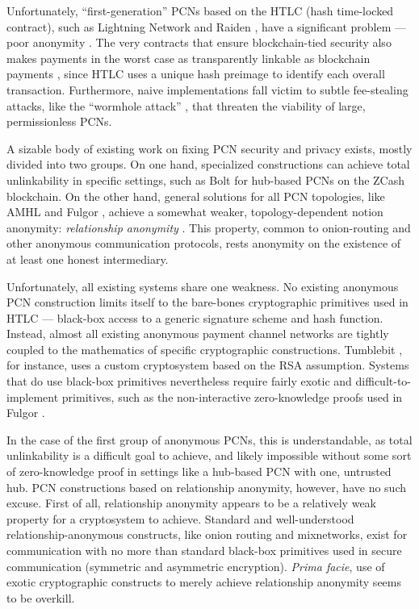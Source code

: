 \documentclass[USenglish,oneside,twocolumn]{article}
\begin{document}
Unfortunately, ``first-generation'' PCNs based on the HTLC (hash time-locked contract), such as Lightning Network \cite{decker2015fast} and Raiden \cite{raiden}, have a significant problem --- poor anonymity \cite{malavolta2017concurrency}. The very contracts that ensure blockchain-tied security also makes payments in the worst case as transparently linkable as blockchain payments \cite{malavolta2017concurrency}, since HTLC uses a unique hash preimage to identify each overall transaction. Furthermore, naive implementations fall victim to subtle fee-stealing attacks, like the ``wormhole attack'' \cite{malavolta2019anonymous}, that threaten the viability of large, permissionless PCNs.

A sizable body of existing work on fixing PCN security and privacy exists, mostly divided into two groups. On one hand, specialized constructions can achieve total unlinkability in specific settings, such as Bolt \cite{green2017bolt} for hub-based PCNs on the ZCash blockchain. On the other hand, general solutions for all PCN topologies, like AMHL \cite{malavolta2019anonymous} and Fulgor \cite{malavolta2017concurrency}, achieve a somewhat weaker, topology-dependent notion anonymity: \emph{relationship anonymity} \cite{backes2013anoa}. This property, common to onion-routing and other anonymous communication protocols, rests anonymity on the existence of at least one honest intermediary.

Unfortunately, all existing systems share one weakness. No existing anonymous PCN construction limits itself to the bare-bones cryptographic primitives used in HTLC --- black-box access to a generic signature scheme and hash function. Instead, almost all existing anonymous payment channel networks are tightly coupled to the mathematics of specific cryptographic constructions. Tumblebit \cite{heilman2017tumblebit}, for instance, uses a custom cryptosystem based on the RSA assumption. Systems that do use black-box primitives nevertheless require fairly exotic and difficult-to-implement primitives, such as the non-interactive zero-knowledge proofs used in Fulgor \cite{malavolta2017concurrency}.

In the case of the first group of anonymous PCNs, this is understandable, as total unlinkability is a difficult goal to achieve, and likely impossible without some sort of zero-knowledge proof in settings like a hub-based PCN with one, untrusted hub. PCN constructions based on relationship anonymity, however, have no such excuse. First of all, relationship anonymity appears to be a relatively weak property for a cryptosystem to achieve. Standard and well-understood relationship-anonymous constructs, like onion routing and mixnetworks, exist for communication with no more than standard black-box primitives used in secure communication (symmetric and asymmetric encryption). \emph{Prima facie}, use of exotic cryptographic constructs to merely achieve relationship anonymity seems to be overkill.
\end{document}
